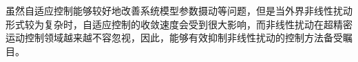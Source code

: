 虽然自适应控制能够较好地改善系统模型参数摄动等问题，但是当外界非线性扰动形式较为复杂时，自适应控制的收敛速度会受到很大影响，而非线性扰动在超精密运动控制领域越来越不容忽视，因此，能够有效抑制非线性扰动的控制方法备受瞩目。

